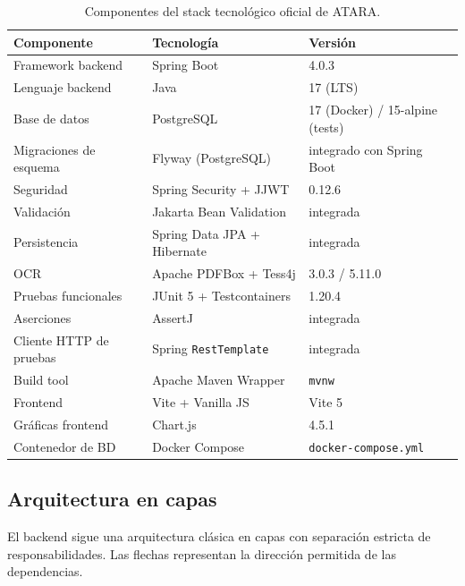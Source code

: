 \documentclass[11pt,a4paper,oneside]{article}
\newcommand{\code}[1]{\texttt{\small #1}}
\begin{document}
\begin{table}[h]
\centering
\renewcommand{\arraystretch}{1.2}
\begin{tabular}{@{}p{4.0cm} p{6.0cm} p{4.0cm}@{}}
\toprule
\textbf{Componente} & \textbf{Tecnología} & \textbf{Versión} \\
\midrule
Framework backend       & Spring Boot                    & 4.0.3 \\
Lenguaje backend        & Java                           & 17 (LTS) \\
Base de datos           & PostgreSQL                     & 17 (Docker) / 15-alpine (tests) \\
Migraciones de esquema  & Flyway (PostgreSQL)            & integrado con Spring Boot \\
Seguridad               & Spring Security + JJWT         & 0.12.6 \\
Validación              & Jakarta Bean Validation        & integrada \\
Persistencia            & Spring Data JPA + Hibernate    & integrada \\
OCR                     & Apache PDFBox + Tess4j         & 3.0.3 / 5.11.0 \\
Pruebas funcionales     & JUnit 5 + Testcontainers       & 1.20.4 \\
Aserciones              & AssertJ                        & integrada \\
Cliente HTTP de pruebas & Spring \code{RestTemplate}     & integrada \\
Build tool              & Apache Maven Wrapper           & \code{mvnw} \\
Frontend                & Vite + Vanilla JS              & Vite 5 \\
Gráficas frontend       & Chart.js                       & 4.5.1 \\
Contenedor de BD        & Docker Compose                 & \code{docker-compose.yml} \\
\bottomrule
\end{tabular}
\caption{Componentes del stack tecnológico oficial de ATARA.}
\end{table}

\subsection{Arquitectura en capas}

El backend sigue una arquitectura clásica en capas con separación estricta de
responsabilidades. Las flechas representan la dirección permitida de las dependencias.
\end{document}
